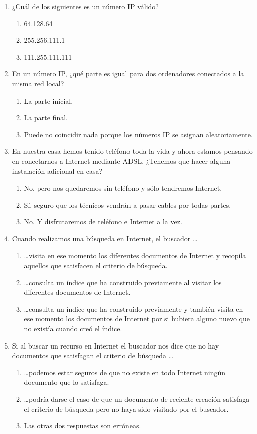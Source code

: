 \begin{enumerate}
\item ¿Cuál de los siguientes es un número IP válido? \begin{enumerate} \item 64.128.64 \item 255.256.111.1 \item 111.255.111.111 \end{enumerate} 

\item En un número IP, ¿qué parte es igual para dos ordenadores conectados a la misma red local? \begin{enumerate} \item La parte inicial. \item La parte final. \item Puede no coincidir nada porque los números IP se asignan aleatoriamente. \end{enumerate} 

\item En nuestra casa hemos tenido teléfono toda la vida y ahora estamos pensando en conectarnos a Internet mediante ADSL. ¿Tenemos que hacer alguna instalación adicional en casa? \begin{enumerate} \item No, pero nos quedaremos sin teléfono y sólo tendremos Internet. \item Sí, seguro que los técnicos vendrán a pasar cables por todas partes. \item No. Y disfrutaremos de teléfono e Internet a la vez. \end{enumerate} 

\item Cuando realizamos una búsqueda en Internet, el buscador \ldots\begin{enumerate} \item \ldots visita en ese momento los diferentes documentos de Internet y recopila aquellos que satisfacen el criterio de búsqueda. \item \ldots consulta un índice que ha construido previamente al visitar los diferentes documentos de Internet. \item \ldots consulta un índice que ha construido previamente y también visita en ese momento los documentos de Internet por si hubiera alguno nuevo que no existía cuando creó el índice. \end{enumerate} 

\item Si al buscar un recurso en Internet el buscador nos dice que no hay documentos que satisfagan el criterio de búsqueda \ldots\begin{enumerate} \item \ldots podemos estar seguros de que no existe en todo Internet ningún documento que lo satisfaga. \item \ldots podría darse el caso de que un documento de reciente creación satisfaga el criterio de búsqueda pero no haya sido visitado por el buscador. \item Las otras dos respuestas son erróneas. \end{enumerate} 


\end{enumerate}
